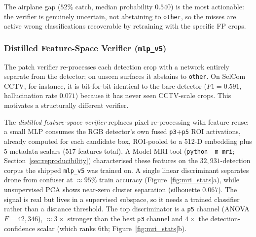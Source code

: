 The airplane gap ($52\%$ catch, median probability $0.540$) is the most actionable: the verifier is genuinely uncertain, not abstaining to \texttt{other}, so the misses are active wrong classifications recoverable by retraining with the specific FP crops.

\subsubsection{Distilled Feature-Space Verifier (\texttt{mlp\_v5})}
\label{sec:distill_verifier}

The patch verifier re-processes each detection crop with a network entirely separate from the detector; on unseen surfaces it abstains to \texttt{other}. On SelCom CCTV, for instance, it is bit-for-bit identical to the bare detector ($F1=0.591$, hallucination rate $0.071$) because it has never seen CCTV-scale crops. This motivates a structurally different verifier.

The \emph{distilled feature-space verifier} replaces pixel re-processing with feature reuse: a small MLP consumes the RGB detector's own fused \texttt{p3}+\texttt{p5} ROI activations, already computed for each candidate box, ROI-pooled to a 512-D embedding plus 5 metadata scalars ($517$ features total). A Model MRI tool (\texttt{python -m mri}; Section~\ref{sec:reproducibility}) characterised these features on the $32{,}931$-detection corpus the shipped \texttt{mlp\_v5} was trained on. A single linear discriminant separates drone from confuser at ${\approx}95\%$ train accuracy (Figure~\ref{fig:mri_stats}a), while unsupervised PCA shows near-zero cluster separation (silhouette $0.067$). The signal is real but lives in a supervised subspace, so it needs a trained classifier rather than a distance threshold. The top discriminator is a \texttt{p5} channel (ANOVA $F=42{,}346$), ${\approx}3\times$ stronger than the best \texttt{p3} channel and $4\times$ the detection-confidence scalar (which ranks 6th; Figure~\ref{fig:mri_stats}b).

